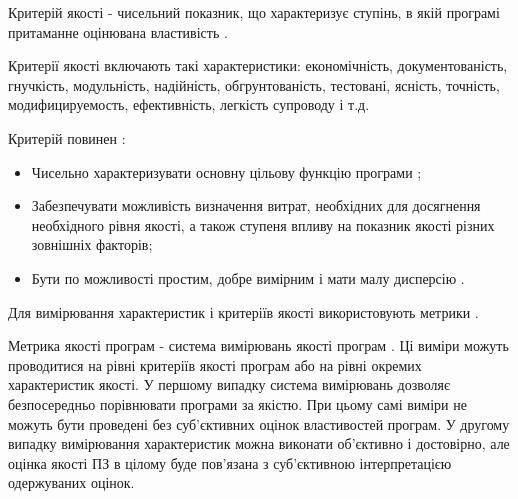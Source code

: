 Критерій якості - чисельний показник, що характеризує ступінь, в якій програмі притаманне оцінювана властивість .

Критерії якості включають такі характеристики: економічність, документованість, гнучкість, модульність, надійність, обгрунтованість, тестовані, ясність, точність, модифицируемость, ефективність, легкість супроводу і т.д.

Критерій повинен :
\begin{itemize}
\item {} 
Чисельно характеризувати основну цільову функцію програми ;

\item {} 
Забезпечувати можливість визначення витрат, необхідних для досягнення необхідного рівня якості, а також ступеня впливу на показник якості різних зовнішніх факторів;

\item {} 
Бути по можливості простим, добре вимірним і мати малу дисперсію .

\end{itemize}

Для вимірювання характеристик і критеріїв якості використовують метрики .

Метрика якості програм - система вимірювань якості програм . Ці виміри можуть проводитися на рівні критеріїв якості програм або на рівні окремих характеристик якості. У першому випадку система вимірювань дозволяє безпосередньо порівнювати програми за якістю. При цьому самі виміри не можуть бути проведені без суб'єктивних оцінок властивостей програм. У другому випадку вимірювання характеристик можна виконати об'єктивно і достовірно, але оцінка якості ПЗ в цілому буде пов'язана з суб'єктивною інтерпретацією одержуваних оцінок.

